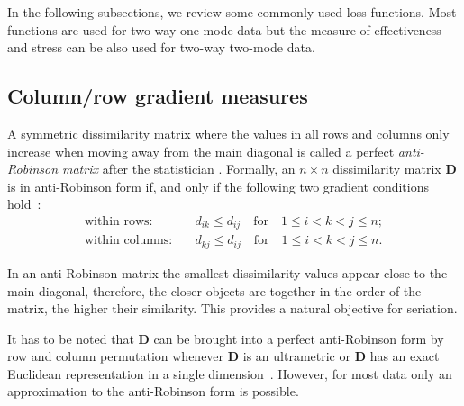 \documentclass[fleqn, a4paper]{article}
\begin{document}
In the following subsections, we review some commonly used loss
functions.  Most functions are used for two-way one-mode data but the
measure of effectiveness and stress can be also used for two-way
two-mode data.



\subsection{Column/row gradient measures}

A symmetric dissimilarity matrix 
where the values in all rows and columns only increase when
moving away from the main diagonal is called a perfect 
\emph{anti-Robinson matrix} after the
statistician \cite{seriation:Robinson:1951}. Formally, 
an $n \times n$ dissimilarity matrix $\mathbf{D}$ is in anti-Robinson form if, 
and only if the following two gradient conditions 
hold~\citep{seriation:Hubert:1987}:
\begin{align}
    \text{within rows:} & \quad  d_{ik} \le d_{ij} \quad \text{for} 
        \quad 1 \le i < k < j \le n; \\ 
    \text{within columns:} & \quad  d_{kj} \le d_{ij} \quad \text{for} 
        \quad 1 \le i < k < j \le n.
\end{align}

In an anti-Robinson matrix the smallest dissimilarity values appear
close to the main diagonal, therefore, the closer objects are together
in the order of the matrix, the higher their similarity.  This provides
a natural objective for seriation.

It has to be noted that $\mathbf{D}$ can be brought into a perfect
anti-Robinson form by row and column permutation whenever $\mathbf{D}$  is an
ultrametric or $\mathbf{D}$ has an exact Euclidean representation in a single
dimension~\citep{seriation:Hubert:1987}. However, for most data only an
approximation to the anti-Robinson form is possible.
\end{document}
